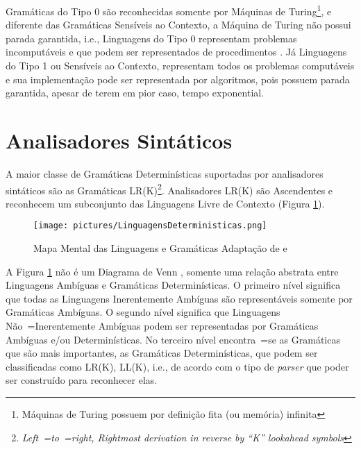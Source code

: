 {    Gramáticas do Tipo 0 são reconhecidas somente por Máquinas de Turing\footnote{Máquinas
    de Turing possuem por definição fita (ou memória) infinita
    },
    e diferente das Gramáticas Sensíveis ao Contexto,
    a Máquina de Turing não possui parada garantida,
    i.e.,
    Linguagens do Tipo 0 representam problemas incomputáveis e
    que podem ser representados de procedimentos \cite{sipserBook}.
    Já Linguagens do Tipo 1 ou Sensíveis ao Contexto,
    representam todos os problemas computáveis e
    sua implementação pode ser representada por algoritmos,
    pois possuem parada garantida,
    apesar de terem em pior caso,
    tempo exponential.


\section{Analisadores Sintáticos}
\label{analisadoresSintaticos}

    A maior classe de Gramáticas Determinísticas suportadas por analisadores
    sintáticos são as Gramáticas LR(K)\footnote{\textit{Left~=to~=right,
    Rightmost derivation in reverse by ``K'' lookahead symbols
    }}.
    Analisadores LR(K) \cite{ahoCompilerDragonBook} são Ascendentes e
    reconhecem um subconjunto das Linguagens Livre de Contexto
    (Figura \ref{fig:pictures/LinguagensDeterministicas.png}).
    \begin{figure}[H]
    \centering
    \texttt{[image: pictures/LinguagensDeterministicas.png]}
    \caption{Mapa Mental das Linguagens e
    Gramáticas \newline Adaptação de  e
    }
    \label{fig:pictures/LinguagensDeterministicas.png}
    \end{figure}

    A Figura \ref{fig:pictures/LinguagensDeterministicas.png} não é
    um Diagrama de Venn \cite{generalizedVennDiagrams},
    somente uma relação abstrata entre Linguagens Ambíguas e
    Gramáticas Determinísticas.
    O primeiro nível significa que todas as Linguagens Inerentemente
    Ambíguas são representáveis somente por Gramáticas Ambíguas.
    O segundo nível significa que Linguagens Não~=Inerentemente Ambíguas podem
    ser representadas por Gramáticas Ambíguas e/ou Determinísticas.
    No terceiro nível encontra~=se as Gramáticas que são mais importantes,
    as Gramáticas Determinísticas,
    que podem ser classificadas como LR(K),
    LL(K), i.e.,
    de acordo com o tipo de \textit{parser} que poder ser construído para reconhecer elas.

}
